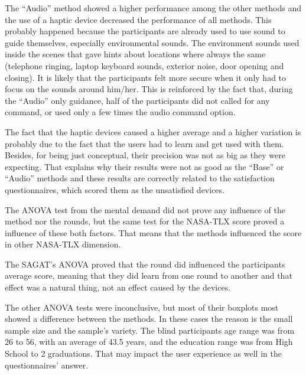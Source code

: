 


The “Audio” method showed a higher performance among the other methods and the use of a haptic device decreased the performance of all methods. This probably happened because the participants are already used to use sound to guide themselves, especially environmental sounds. The environment sounds used inside the scenes that gave hints about locations where always the same (telephone ringing, laptop keyboard sounds, exterior noise, door opening and closing). It is likely that the participants felt more secure when it only had to focus on the sounds around him/her. This is reinforced by the fact that, during the “Audio” only guidance, half of the participants did not called for any command, or used only a few times the audio command option.

The fact that the haptic devices caused a higher average and a higher variation is probably due to the fact that the users had to learn and get used with them. Besides, for being just conceptual, their precision was not as big as they were expecting. That explains why their results were not as good as the “Base” or “Audio” methods and these results are correctly related to the satisfaction questionnaires, which scored them as the unsatisfied devices.

The ANOVA test from the mental demand did not prove any influence of the method nor the rounds, but the same test for the NASA-TLX score proved a influence of these both factors. That means that the methods influenced the score in other NASA-TLX dimension.

The SAGAT's ANOVA proved that the round did influenced the participants average score, meaning that they did learn from one round to another and that effect was a natural thing, not an effect caused by the devices.

The other ANOVA tests were inconclusive, but most of their boxplots most showed a difference between the methods. In these cases the reason is the small sample size and the sample’s variety. The blind participants age range was from 26 to 56, with an average of 43.5 years, and the education range was from High School to 2 graduations. That may impact the user experience as well in the questionnaires' answer.

